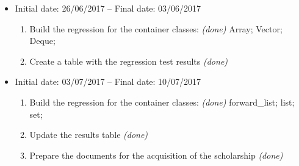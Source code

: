 \documentclass[11pt]{article}
\begin{document}
\begin{itemize}
	\item Initial date: 26/06/2017 -- Final date: 03/06/2017
	\begin{enumerate}
		\item Build the regression for the container classes: {\it (done)}
		    \subitem Array;
		    \subitem Vector;
		    \subitem Deque;
		\item Create a table with the regression test results {\it (done)}
	\end{enumerate}
	
	\item Initial date: 03/07/2017 -- Final date: 10/07/2017
	\begin{enumerate}
		\item Build the regression for the container classes: {\it (done)}
		    \subitem forward\_list;
		    \subitem list;
		    \subitem set;
		\item Update the results table {\it (done)}
		\item Prepare the documents for the acquisition of the scholarship {\it (done)}
	\end{enumerate}
	
	
\end{itemize}
\end{document}
